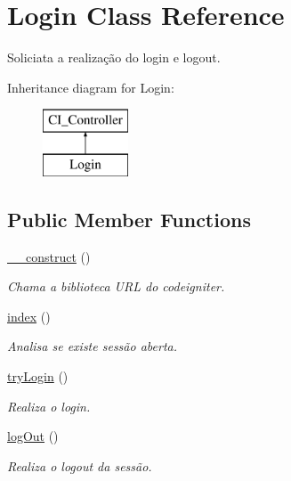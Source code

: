\hypertarget{classLogin}{\section{Login Class Reference}
\label{classLogin}
}


Soliciata a realização do login e logout.  


Inheritance diagram for Login\-:\begin{figure}[H]
\begin{center}
\leavevmode
\includegraphics[height=2.000000cm]{classLogin}
\end{center}
\end{figure}
\subsection*{Public Member Functions}
\begin{DoxyCompactItemize}
\item 
\hypertarget{classLogin_a1c32d6f7816f8912e52bb554035fbf14}{\hyperlink{classLogin_a1c32d6f7816f8912e52bb554035fbf14}{\-\_\-\-\_\-construct} ()}\label{classLogin_a1c32d6f7816f8912e52bb554035fbf14}

\begin{DoxyCompactList}\small\item\em Chama a biblioteca U\-R\-L do codeigniter. \end{DoxyCompactList}\item 
\hyperlink{classLogin_a2eed7119960cf8499981ed4c3678345e}{index} ()
\begin{DoxyCompactList}\small\item\em Analisa se existe sessão aberta. \end{DoxyCompactList}\item 
\hyperlink{classLogin_a8a46e12700d878082ecb6a42bda5be9b}{try\-Login} ()
\begin{DoxyCompactList}\small\item\em Realiza o login. \end{DoxyCompactList}\item 
\hyperlink{classLogin_ae939c3bb65c459e67058c4dd5910aa56}{log\-Out} ()
\begin{DoxyCompactList}\small\item\em Realiza o logout da sessão. \end{DoxyCompactList}\end{DoxyCompactItemize}



